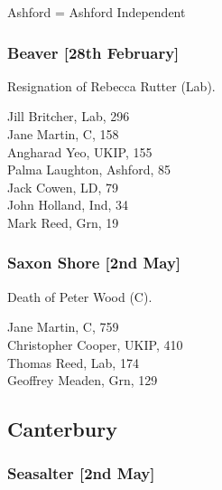 \documentclass[a4paper,openany,10pt]{book}
\begin{document}
Ashford = Ashford Independent

\subsubsection*{Beaver \hspace*{\fill}\nolinebreak[1]%
\enspace\hspace*{\fill}
[28th February]}


Resignation of Rebecca Rutter (Lab).



Jill Britcher, Lab, 296\\
Jane Martin, C, 158\\
Angharad Yeo, UKIP, 155\\
Palma Laughton, Ashford, 85\\
Jack Cowen, LD, 79\\
John Holland, Ind, 34\\
Mark Reed, Grn, 19\\


\subsubsection*{Saxon Shore \hspace*{\fill}\nolinebreak[1]%
\enspace\hspace*{\fill}
[2nd May]}


Death of Peter Wood (C).



Jane Martin, C, 759\\
Christopher Cooper, UKIP, 410\\
Thomas Reed, Lab, 174\\
Geoffrey Meaden, Grn, 129\\


\subsection*{Canterbury}

\subsubsection*{Seasalter \hspace*{\fill}\nolinebreak[1]%
\enspace\hspace*{\fill}
[2nd May]}
\end{document}
